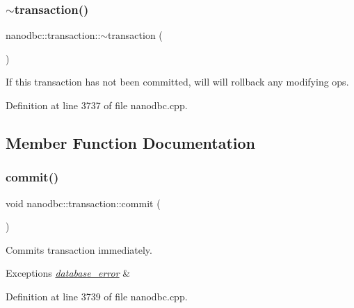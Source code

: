 \subsubsection{\texorpdfstring{$\sim$transaction()}{~transaction()}}
{\footnotesize\ttfamily nanodbc\+::transaction\+::$\sim$transaction (\begin{DoxyParamCaption}{ }\end{DoxyParamCaption})\hspace{0.3cm}{\ttfamily [noexcept]}}



If this transaction has not been committed, will will rollback any modifying ops. 



Definition at line 3737 of file nanodbc.\+cpp.



\subsection{Member Function Documentation}
\mbox{\label{classnanodbc_1_1transaction_ad13c6871ac5f572456e881c2e52c2c91}} 
\subsubsection{\texorpdfstring{commit()}{commit()}}
{\footnotesize\ttfamily void nanodbc\+::transaction\+::commit (\begin{DoxyParamCaption}{ }\end{DoxyParamCaption})}



Commits transaction immediately. 


\begin{DoxyExceptions}{Exceptions}
{\em \mbox{\hyperlink{classnanodbc_1_1database__error}{database\+\_\+error}}} & \\
\hline
\end{DoxyExceptions}


Definition at line 3739 of file nanodbc.\+cpp.

\mbox{\label{classnanodbc_1_1transaction_a6192b685fe9f0046b706b3feb874a957}} 
